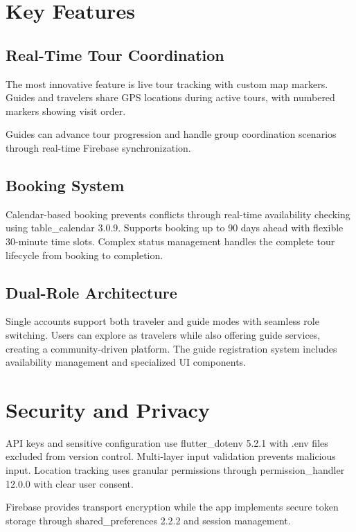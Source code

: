 \documentclass[12pt,a4paper]{article}
\begin{document}
\section{Key Features}

\subsection{Real-Time Tour Coordination}

The most innovative feature is live tour tracking with custom map markers. Guides and travelers share GPS locations during active tours, with numbered markers showing visit order.

Guides can advance tour progression and handle group coordination scenarios through real-time Firebase synchronization.

\subsection{Booking System}

Calendar-based booking prevents conflicts through real-time availability checking using table\_calendar 3.0.9. Supports booking up to 90 days ahead with flexible 30-minute time slots. Complex status management handles the complete tour lifecycle from booking to completion.

\subsection{Dual-Role Architecture}

Single accounts support both traveler and guide modes with seamless role switching. Users can explore as travelers while also offering guide services, creating a community-driven platform. The guide registration system includes availability management and specialized UI components.

\section{Security and Privacy}

API keys and sensitive configuration use flutter\_dotenv 5.2.1 with .env files excluded from version control. Multi-layer input validation prevents malicious input. Location tracking uses granular permissions through permission\_handler 12.0.0 with clear user consent.

Firebase provides transport encryption while the app implements secure token storage through shared\_preferences 2.2.2 and session management.
\end{document}
